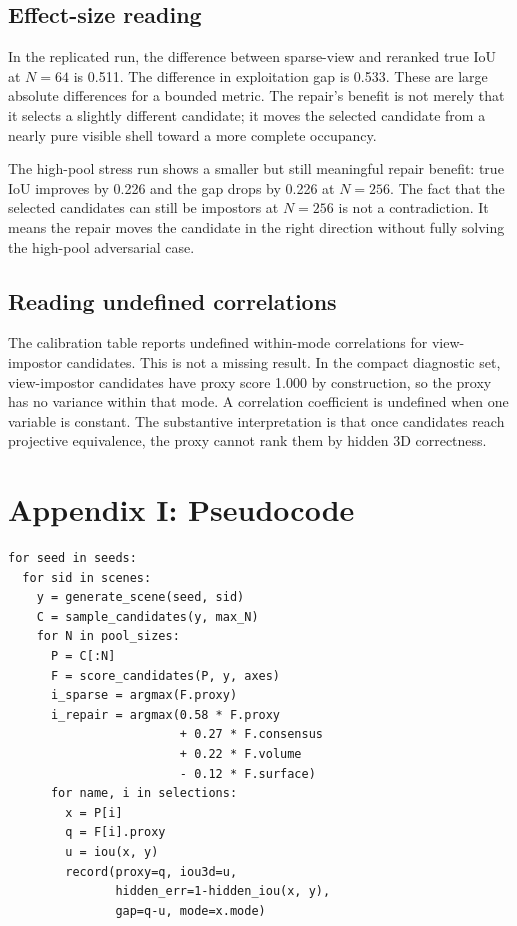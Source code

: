 \documentclass{article}
\begin{document}
\subsection{Effect-size reading}

In the replicated run, the difference between sparse-view and reranked true IoU
at $N=64$ is 0.511. The difference in exploitation gap is 0.533. These are
large absolute differences for a bounded metric. The repair's benefit is not
merely that it selects a slightly different candidate; it moves the selected
candidate from a nearly pure visible shell toward a more complete occupancy.

The high-pool stress run shows a smaller but still meaningful repair benefit:
true IoU improves by 0.226 and the gap drops by 0.226 at $N=256$. The fact that
the selected candidates can still be impostors at $N=256$ is not a contradiction.
It means the repair moves the candidate in the right direction without fully
solving the high-pool adversarial case.

\subsection{Reading undefined correlations}

The calibration table reports undefined within-mode correlations for
view-impostor candidates. This is not a missing result. In the compact
diagnostic set, view-impostor candidates have proxy score 1.000 by
construction, so the proxy has no variance within that mode. A correlation
coefficient is undefined when one variable is constant. The substantive
interpretation is that once candidates reach projective equivalence, the proxy
cannot rank them by hidden 3D correctness.

\section{Appendix I: Pseudocode}

\begin{verbatim}
for seed in seeds:
  for sid in scenes:
    y = generate_scene(seed, sid)
    C = sample_candidates(y, max_N)
    for N in pool_sizes:
      P = C[:N]
      F = score_candidates(P, y, axes)
      i_sparse = argmax(F.proxy)
      i_repair = argmax(0.58 * F.proxy
                        + 0.27 * F.consensus
                        + 0.22 * F.volume
                        - 0.12 * F.surface)
      for name, i in selections:
        x = P[i]
        q = F[i].proxy
        u = iou(x, y)
        record(proxy=q, iou3d=u,
               hidden_err=1-hidden_iou(x, y),
               gap=q-u, mode=x.mode)
\end{verbatim}
\end{document}
